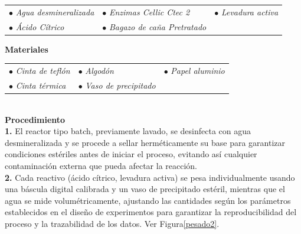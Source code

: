 \documentclass[12pt]{article}
\begin{document}
				\begin{tabular}{p{0.3\textwidth}p{}p{}}	 
					 	 	$\bullet$ \textit{Agua desmineralizada} & $\bullet$ \textit{Enzimas Cellic Ctec 2}  & $\bullet$ \textit{Levadura activa} \\
					 $\bullet$ \textit{Ácido Cítrico} & $\bullet$ \textit{Bagazo de caña Pretratado} & \\
					
					\end{tabular}
					 
					 
					 	\textbf{Materiales} 
					 
					 \begin{tabular}{p{}p{}p{}}
					 $\bullet$ \textit{Cinta de teflón} & $\bullet$ \textit{Algodón } & $\bullet$ \textit{ Papel aluminio} \\
					 	$\bullet$ \textit{Cinta térmica}  & $\bullet$ \textit{Vaso de precipitado} &
					 \end{tabular}
					 \\[0.5em]
					 
					 
					 
		  \textbf{Procedimiento}
					\\[0.5em]	 
		 \textbf{1.}  El reactor tipo batch, previamente lavado, se desinfecta con agua desmineralizada y se procede a sellar herméticamente su base para garantizar condiciones estériles antes de iniciar el proceso, evitando así cualquier contaminación externa que pueda afectar la reacción.\\[0.5em]

		 	
		 \textbf{2.} Cada reactivo (ácido cítrico, levadura activa) se pesa individualmente usando una báscula digital calibrada y un vaso de precipitado estéril, mientras que el agua se mide volumétricamente, ajustando las cantidades según los parámetros establecidos en el diseño de experimentos para garantizar la reproducibilidad del proceso y la trazabilidad de los datos. Ver Figura\ref{pesado2}.
		 
	
		 
\end{document}
